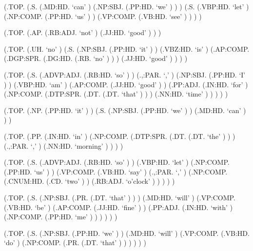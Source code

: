\documentclass[10pt]{article}
\begin{document}
\begin{parsetree}  (.TOP. (.S. (.MD:HD. `can' ) (.NP:SBJ. (.PP:HD. `we' ) ) ) (.S. (.VBP:HD. `let' ) (.NP:COMP. (.PP:HD. `us' ) ) (.VP:COMP. (.VB:HD. `see' ) ) ) ) \end{parsetree}

\begin{parsetree}  (.TOP. (.AP. (.RB:ADJ. `not' ) (.JJ:HD. `good' ) ) ) \end{parsetree}

\begin{parsetree}  (.TOP. (.UH. `no' ) (.S. (.NP:SBJ. (.PP:HD. `it' ) ) (.VBZ:HD. `is' ) (.AP:COMP. (.DGP:SPR. (.DG:HD. (.RB. `no' ) ) ) (.JJ:HD. `good' ) ) ) ) \end{parsetree}

\begin{parsetree}  (.TOP. (.S. (.ADVP:ADJ. (.RB:HD. `so' ) ) (.,:PAR. `,' ) (.NP:SBJ. (.PP:HD. `I' ) ) (.VBP:HD. `am' ) (.AP:COMP. (.JJ:HD. `good' ) ) (.PP:ADJ. (.IN:HD. `for' ) (.NP:COMP. (.DTP:SPR. (.DT. (.DT. `that' ) ) ) (.NN:HD. `time' ) ) ) ) ) \end{parsetree}

\begin{parsetree}  (.TOP. (.NP. (.PP:HD. `it' ) ) (.S. (.NP:SBJ. (.PP:HD. `we' ) ) (.MD:HD. `can' ) ) ) \end{parsetree}

\begin{parsetree}  (.TOP. (.PP. (.IN:HD. `in' ) (.NP:COMP. (.DTP:SPR. (.DT. (.DT. `the' ) ) ) (.,:PAR. `,' ) (.NN:HD. `morning' ) ) ) ) \end{parsetree}

\begin{parsetree}  (.TOP. (.S. (.ADVP:ADJ. (.RB:HD. `so' ) ) (.VBP:HD. `let' ) (.NP:COMP. (.PP:HD. `us' ) ) (.VP:COMP. (.VB:HD. `say' ) (.,:PAR. `,' ) (.NP:COMP. (.CNUM:HD. (.CD. `two' ) ) (.RB:ADJ. `o'clock' ) ) ) ) ) \end{parsetree}

\begin{parsetree}  (.TOP. (.S. (.NP:SBJ. (.PR. (.DT. `that' ) ) ) (.MD:HD. `will' ) (.VP:COMP. (.VB:HD. `be' ) (.AP:COMP. (.JJ:HD. `fine' ) ) (.PP:ADJ. (.IN:HD. `with' ) (.NP:COMP. (.PP:HD. `me' ) ) ) ) ) ) \end{parsetree}

\begin{parsetree}  (.TOP. (.S. (.NP:SBJ. (.PP:HD. `we' ) ) (.MD:HD. `will' ) (.VP:COMP. (.VB:HD. `do' ) (.NP:COMP. (.PR. (.DT. `that' ) ) ) ) ) ) \end{parsetree}
\end{document}
